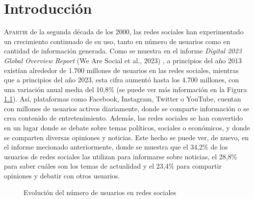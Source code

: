 \chapter{Introducción}
\label{chap:introduccion}

\lettrine{A}{partir} de la segunda década de los 2000, las redes sociales han experimentado
un crecimiento continuado de su uso, tanto en número de usuarios como en
cantidad de información generada. Como se muestra en el informe \textit{Digital 2023 Global Overview Report} (We Are Social et al., 2023)
\cite{wearesocial}, a principios del año 2013 existían alrededor de 1.700 millones de usuarios en las redes sociales,
mientras que a principios del año 2023, esta cifra aumentó hasta los 4.700 millones, con una variación anual media del 10,8\% (se puede ver
más información en la Figura \ref{fig:usuarios_redes_sociales}).
Así, plataformas como Facebook, Instagram, Twitter o YouTube, cuentan con millones de usuarios activos diariamente,
donde se comparte información o se crea contenido de entretenimiento. Además, las redes sociales se han convertido en
un lugar donde se debate sobre temas políticos, sociales o económicos, y donde se comparten diversas opiniones y noticias.
Este hecho se puede ver, de nuevo, en el informe mecionado anteriormente, donde se muestra que el 34,2\% de los usuarios
de redes sociales las utilizan para informarse sobre noticias, el 28,8\% para saber cuáles son los temas de actualidad
y el 23,4\% para compartir opiniones y debatir con otros usuarios.

\bigskip
\begin{figure}[H]
	\centering
	\caption{Evolución del número de usuarios en redes sociales}
	\label{fig:usuarios_redes_sociales}
\end{figure}

